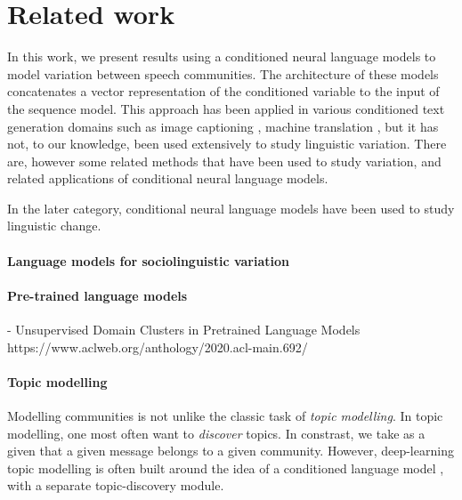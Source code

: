 \documentclass[11pt,a4paper]{article}
\begin{document}
\section{Related work}

In this work, we present results using a conditioned neural language models
to model variation between speech communities.
The architecture of these models concatenates a vector representation
of the conditioned variable to the input of the sequence model.
This approach has been applied in various conditioned text generation domains such as 
image captioning \citep{Vinyals2015}, machine translation \citep{Kalchbrenner2013},
but it has not, to our knowledge, been used extensively to study linguistic variation.
There are, however some related methods that have been used to study variation,
and related applications of conditional neural language models.

In the later category, conditional neural language models have been
used to study linguistic change.



\paragraph{Language models for sociolinguistic variation}
\cite{DelTredici2017}

\cite{khan2020reddit}


\paragraph{Pre-trained language models}
- Unsupervised Domain Clusters in Pretrained Language Models https://www.aclweb.org/anthology/2020.acl-main.692/ %

\paragraph{Topic modelling}
Modelling communities is not unlike the classic task of \emph{topic
  modelling}. In topic modelling, one most often want to
\emph{discover} topics. In constrast, we take as a given that a given
message belongs to a given community. However, deep-learning topic
modelling is often built around the idea of a conditioned language
model \citep{Lau2017a}, with a separate topic-discovery module.


\end{document}
